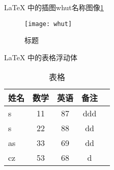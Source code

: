\documentclass{ctexart}
\begin{document}
	\LaTeX{} 中的插图whut名称图像\ref{whut}
	\begin{figure}[htbp] %
		\centering %
		\texttt{[image: whut]} %
		\caption{标题} %
		\label{whut} %
	\end{figure}%
	
	\LaTeX{} 中的表格浮动体
	\begin{table}[htbp] %
		\centering %
		\caption{表格} %
		\begin{tabular}{|l||c|c|c|p{1.5cm}|}
		\hline
		姓名 & 数学 & 英语 & 备注 \\
		\hline \hline
		s & 11 & 87 & ddd \\
		\hline
		s & 22 & 88 & dd \\
		\hline
		as & 33 & 69 & dd \\
		\hline
		cz & 53 & 68 & d \\
		\hline
		\end{tabular}

		\label{table} %
	\end{table}%
\end{document}
